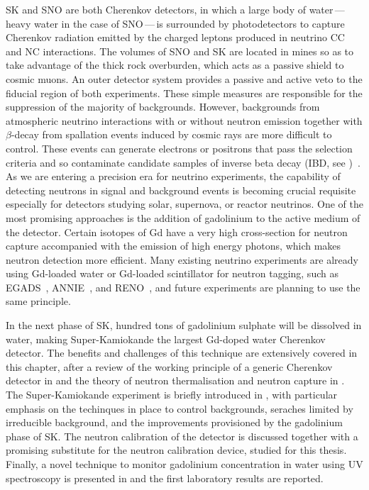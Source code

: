 SK and SNO are both Cherenkov detectors, in which a large body of water\,---\,heavy water in the case of SNO\,---\,is surrounded by %
photodetectors to capture Cherenkov radiation emitted by the charged leptons produced in neutrino CC and NC interactions.
The volumes of SNO and SK are located in mines so as to take advantage of the thick rock overburden, %
which acts as a passive shield to cosmic muons.
An outer detector system provides a passive and active veto to the fiducial region of both experiments.
These simple measures are responsible for the suppression of the majority of backgrounds.
However, backgrounds from atmospheric neutrino interactions with or without neutron emission together %
with $\beta$-decay from spallation events induced by cosmic rays are more difficult to control.
These events can generate electrons or positrons that pass the selection criteria and so contaminate %
candidate samples of inverse beta decay (IBD, see )~\cite{Zhang:2013tua, Super-Kamiokande:2015xra}.
As we are entering a precision era for neutrino experiments, the capability of detecting neutrons %
in signal and background events is becoming crucial requisite
especially for detectors studying solar, supernova, or reactor neutrinos.
One of the most promising approaches is the addition of gadolinium to the active medium of the detector.
Certain isotopes of Gd have a very high cross-section for neutron capture %
accompanied with the emission of high energy photons, which makes neutron detection more efficient.
Many existing neutrino experiments are already using Gd-loaded water or Gd-loaded scintillator for neutron tagging, %
such as EGADS~\cite{Ikeda:2019pcm}, ANNIE~\cite{Back:2019aqi}, and RENO~\cite{Ahn:2010vy}, %
and future experiments are planning to use the same principle.

In the next phase of SK, hundred tons of gadolinium sulphate will be dissolved in water, making %
Super-Kamiokande the largest Gd-doped water Cherenkov detector.	%
The benefits and challenges of this technique are extensively covered in this chapter, %
after a review of the working principle of a generic Cherenkov detector in  %
and the theory of neutron thermalisation and neutron capture in .
The Super-Kamiokande experiment is briefly introduced in , with %
particular emphasis on the techinques in place to control backgrounds, %
seraches limited by irreducible background, and the improvements provisioned by the gadolinium phase of SK.
The neutron calibration of the detector is discussed 
together with a promising substitute for the neutron calibration device, studied for this thesis.
Finally, a novel technique to monitor gadolinium concentration in water %
using UV spectroscopy is presented in  and the first laboratory results are reported.

